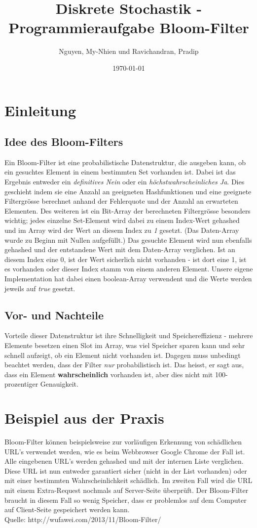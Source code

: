 \documentclass[a4paper,12pt]{article}
\begin{document}
\title{Diskrete Stochastik - Programmieraufgabe Bloom-Filter}
\author{Nguyen, My-Nhien und Ravichandran, Pradip}
\date{\today}
\maketitle

\section{Einleitung}
\subsection{Idee des Bloom-Filters}
Ein Bloom-Filter ist eine probabilistische Datenstruktur, die ausgeben kann, ob ein gesuchtes Element in einem bestimmten Set vorhanden ist. Dabei ist das Ergebnis entweder ein \textit{definitives Nein} oder ein \textit{höchstwahrscheinliches Ja}.
Dies geschieht indem sie eine Anzahl an geeigneten Hashfunktionen und eine geeignete Filtergrösse berechnet anhand der Fehlerquote und der Anzahl an erwarteten Elementen. Des weiteren ist ein Bit-Array der berechneten Filtergrösse besonders wichtig; jedes einzelne Set-Element wird dabei zu einem Index-Wert gehashed und im Array wird der Wert an diesem Index zu \textit{1} gesetzt. (Das Daten-Array wurde zu Beginn mit Nullen aufgefüllt.)
Das gesuchte Element wird nun ebenfalls gehashed und der entstandene Wert mit dem Daten-Array verglichen. Ist an diesem Index eine 0, ist der Wert sicherlich nicht vorhanden - ist dort eine 1, ist es vorhanden oder dieser Index stamm von einem anderen Element.
Unsere eigene Implementation hat dabei einen boolean-Array verwendent und die Werte werden jeweils auf \textit{true} gesetzt.
\subsection{Vor- und Nachteile}
Vorteile dieser Datenstruktur ist ihre Schnelligkeit und Speichereffizienz -  mehrere Elemente besetzen einen Slot im Array, was viel Speicher sparen kann und sehr schnell aufzeigt, ob ein Element nicht vorhanden ist. Dagegen muss unbedingt beachtet werden, dass der Filter \textit{nur} probabilistisch ist. Das heisst, er sagt aus, dass ein Element \textbf{wahrscheinlich} vorhanden ist, aber dies nicht mit 100-prozentiger Genauigkeit.
\section{Beispiel aus der Praxis}
Bloom-Filter können beispielsweise zur vorläufigen Erkennung von schädlichen URL's verwendet werden, wie es beim Webbrowser Google Chrome der Fall ist. Alle eingebenen URL's werden gehashed und mit der internen Liste verglichen. Diese URL ist nun entweder garantiert sicher (nicht in der List vorhanden) oder mit einer bestimmten Wahrscheinlichkeit schädlich. Im zweiten Fall wird die URL mit einem Extra-Request nochmals auf Server-Seite überprüft. Der Bloom-Filter braucht in diesem Fall so wenig Speicher, dass er problemlos auf dem Computer auf Client-Seite gespeichert werden kann.\\
Quelle: http://wufawei.com/2013/11/Bloom-Filter/
\end{document}
